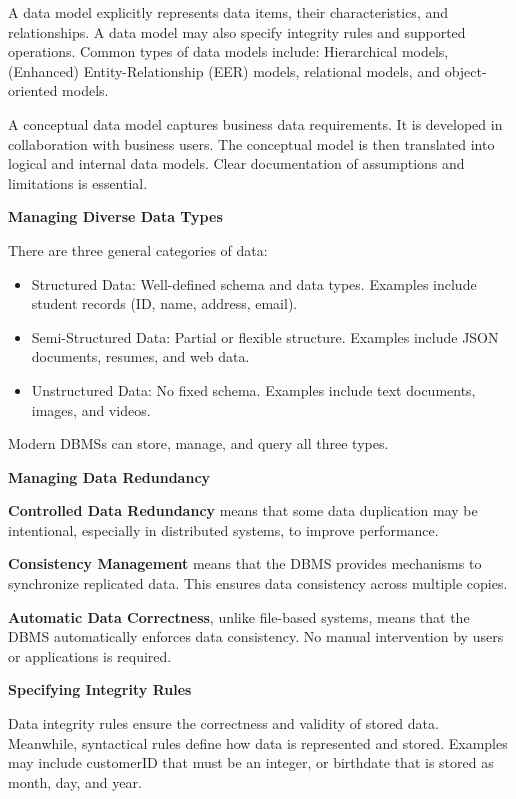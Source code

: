 \documentclass[11pt]{article}
\begin{document}
A data model explicitly represents data items, their characteristics, and relationships. A data model may also specify integrity rules and supported operations. Common types of data models include: Hierarchical models, (Enhanced) Entity-Relationship (EER) models, relational models, and object-oriented models.

A conceptual data model captures business data requirements. It is developed in collaboration with business users. The conceptual model is then translated into logical and internal data models. Clear documentation of assumptions and limitations is essential.

\vspace{11pt}
\textbf{Managing Diverse Data Types}
\vspace{11pt}

There are three general categories of data:
\begin{itemize}
    \item Structured Data: Well-defined schema and data types. Examples include student records (ID, name, address, email).
    \item Semi-Structured Data: Partial or flexible structure. Examples include JSON documents, resumes, and web data.
    \item Unstructured Data: No fixed schema. Examples include text documents, images, and videos.
\end{itemize}

Modern DBMSs can store, manage, and query all three types.

\vspace{11pt}
\textbf{Managing Data Redundancy}
\vspace{11pt}

\textbf{Controlled Data Redundancy} means that some data duplication may be intentional, especially in distributed systems, to improve performance.

\textbf{Consistency Management} means that the DBMS provides mechanisms to synchronize replicated data. This ensures data consistency across multiple copies.

\textbf{Automatic Data Correctness}, unlike file-based systems, means that the DBMS automatically enforces data consistency. No manual intervention by users or applications is required.

\vspace{11pt}
\textbf{Specifying Integrity Rules}
\vspace{11pt}

Data integrity rules ensure the correctness and validity of stored data. Meanwhile, syntactical rules define how data is represented and stored. Examples may include customerID that must be an integer, or birthdate that is stored as month, day, and year.
\end{document}
